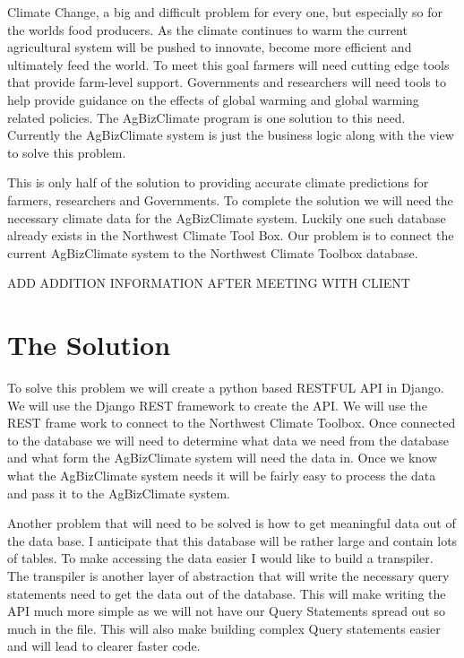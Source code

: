 \documentclass[letterpaper,10pt]{article}
\begin{document}
	Climate Change, a big and difficult problem for every one, but especially so for the worlds food producers. As the climate continues to warm the current agricultural system will be pushed to innovate, become more efficient and ultimately feed the world. To meet this goal farmers will need cutting edge tools that provide farm-level support. Governments and researchers will need tools to help provide guidance on the effects of global warming and global warming related policies. The AgBizClimate program is one solution to this need. Currently the AgBizClimate system is just the business logic along with the view to solve this problem.
		
		This is only half of the solution to providing accurate climate predictions for farmers, researchers and Governments. To complete the solution we will need the necessary climate data for the AgBizClimate system. Luckily one such database already exists in the Northwest Climate Tool Box. Our problem is to connect the current AgBizClimate system to the Northwest Climate Toolbox database. 
		
		ADD ADDITION INFORMATION AFTER MEETING WITH CLIENT

\section{The Solution}

		To solve this problem we will create a python based RESTFUL API in Django. We will use the Django REST framework to create the API. We will use the REST frame work to connect to the Northwest Climate Toolbox. Once connected to the database we will need to determine what data we need from the database and what form the AgBizClimate system will need the data in. Once we know what the AgBizClimate system needs it will be fairly easy to process the data and pass it to the AgBizClimate system.
	
		Another problem that will need to be solved is how to get meaningful data out of the data base. I anticipate that this database will be rather large and contain lots of tables. To make accessing the data easier I would like to build a transpiler. The transpiler is another layer of abstraction that will write the necessary query statements need to get the data out of the database. This will make writing the API much more simple as we will not have our Query Statements spread out so much in the file. This will also make building complex Query statements easier and will lead to clearer faster code.
		
\end{document}

